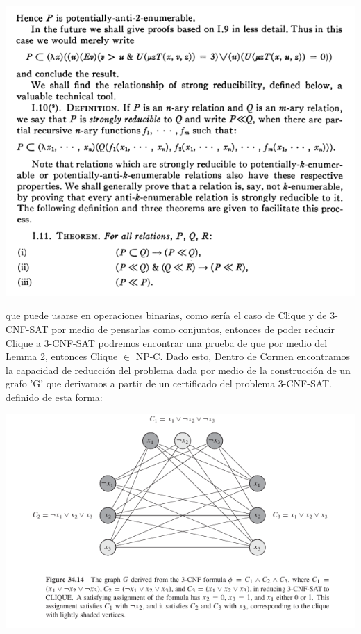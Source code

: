 \documentclass[a4paper]{article}
\begin{document}
\begin{center}
    \includegraphics[scale=0.5]{Shabiro.png}    
\end{center}

que puede usarse en operaciones binarias, como sería el caso de Clique y de 3-CNF-SAT
por medio de pensarlas como conjuntos, entonces de poder reducir Clique a 3-CNF-SAT podremos
encontrar una prueba de que por medio del Lemma 2, entonces Clique $ \in $ NP-C. Dado esto,
Dentro de Cormen encontramos la capacidad de reducción del problema dada por medio de la 
construcción de un grafo 'G' que derivamos a partir de un certificado del problema 3-CNF-SAT.
definido de esta forma: 
\begin{center}
    \includegraphics*[scale=0.7]{gCNF3.png}
\end{center}
\end{document}
